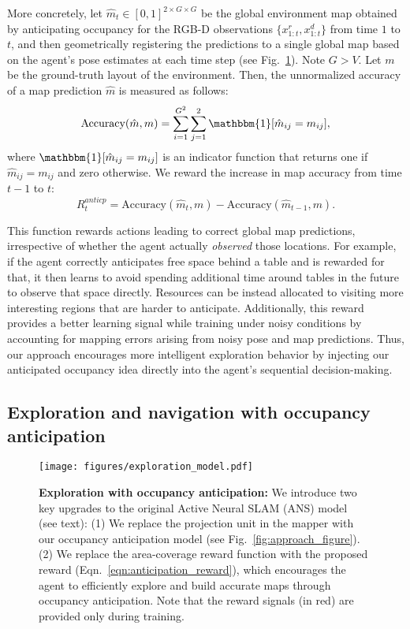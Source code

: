 \documentclass[runningheads]{llncs}
\newcommand{\tb}[1]{\textbf{#1}}
\begin{document}
More concretely, let $\hat{m}_{t} \in [0, 1]^{2 \times G \times G}$ be the global environment map obtained by anticipating occupancy for the RGB-D observations $\{x^{r}_{1:t}, x^{d}_{1:t}\}$ from time $1$ to $t$, and then geometrically registering the predictions to a single global map based on the agent's pose estimates at each time step (see Fig.~\ref{fig:exploration_model}). Note $G > V$. Let $m$ be the ground-truth layout of the environment. Then, the unnormalized accuracy of a map prediction $\hat{m}$ is measured as follows: 
\begin{equation}
\label{eqn:anticipation_accuracy}
   \text{Accuracy}(\hat{m}, m) = \sum_{i=1}^{G^2} \sum_{j=1}^{2}  \mathbbm{1}[\hat{m}_{ij} = m_{ij}],
\end{equation}  
where $\mathbbm{1}[\hat{m}_{ij} = m_{ij}]$ is an indicator function that returns one if $\hat{m}_{ij} = m_{ij}$ and zero otherwise. We reward the increase in map accuracy from time $t-1$ to $t$:
\begin{equation}
\label{eqn:anticipation_reward}
    R_{t}^{anticp} = \text{Accuracy}(\hat{m}_{t}, m) - \text{Accuracy}(\hat{m}_{t-1}, m).
\end{equation}

This function rewards actions leading to correct global map predictions, irrespective of whether the agent actually \emph{observed} those locations. For example, if the agent correctly anticipates free space behind a table and is rewarded for that, it then learns to avoid spending additional time around tables in the future to observe that space directly. Resources can be instead allocated to visiting more interesting regions that are harder to anticipate. Additionally, this reward provides a better learning signal while training under noisy conditions by accounting for mapping errors arising from noisy pose and map predictions. Thus, our approach encourages more intelligent exploration behavior by injecting our anticipated occupancy idea directly into the agent's sequential decision-making.


\subsection{Exploration and navigation with occupancy anticipation}
\label{sec:navigation_model}

\begin{figure}[t]
    \centering
    \texttt{[image: figures/exploration\_model.pdf]}
    \caption{\small\tb{Exploration with occupancy anticipation:} We introduce two key upgrades to the original Active Neural SLAM (ANS) model~\cite{chaplot2020learning} (see text): (1) We replace the projection unit in the mapper with our occupancy anticipation model (see Fig.~\ref{fig:approach_figure}). (2) We replace the area-coverage reward function with the proposed reward (Eqn.~\ref{eqn:anticipation_reward}), which encourages the agent to efficiently explore and build accurate maps through occupancy anticipation. Note that the reward signals (in red) are provided only during training.}
    \label{fig:exploration_model}
\end{figure}
\end{document}
